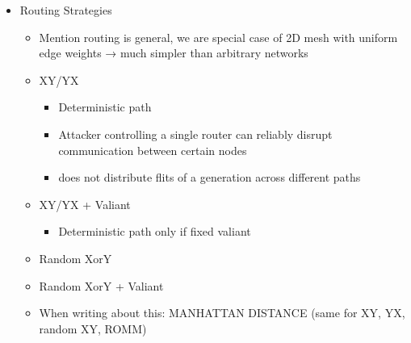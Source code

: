 \begin{itemize}
    \item Routing Strategies
        \begin{itemize}
            \item Mention routing is general, we are special case of 2D mesh with uniform edge weights → much simpler than arbitrary networks
            \item XY/YX
                \begin{itemize}
                    \item Deterministic path
                    \item Attacker controlling a single router can reliably disrupt communication between certain nodes
                    \item does not distribute flits of a generation across different paths
                \end{itemize}
            \item XY/YX + Valiant
                \begin{itemize}
                    \item Deterministic path only if fixed valiant
                \end{itemize}
            \item Random XorY
            \item Random XorY + Valiant
            \item When writing about this: MANHATTAN DISTANCE (same for XY, YX, random XY, ROMM)
        \end{itemize}
\end{itemize}

\iffalse
